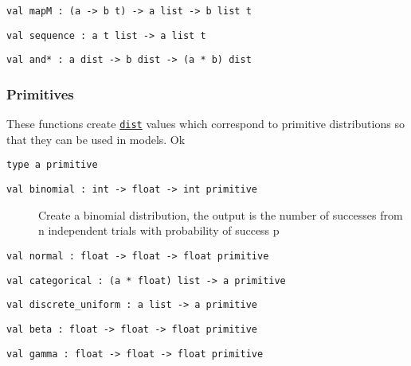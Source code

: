 \protect\hyperlink{val-mapM}{}\texttt{val\ mapM\ :\ (\textquotesingle{}a\ -\textgreater{}\ \textquotesingle{}b\ t)\ -\textgreater{}\ \textquotesingle{}a\ list\ -\textgreater{}\ \textquotesingle{}b\ list\ t}

\protect\hyperlink{val-sequence}{}\texttt{val\ sequence\ :\ \textquotesingle{}a\ t\ list\ -\textgreater{}\ \textquotesingle{}a\ list\ t}

\protect\hyperlink{val-andux2a}{}\texttt{val\ and*\ :\ \textquotesingle{}a\ dist\ -\textgreater{}\ \textquotesingle{}b\ dist\ -\textgreater{}\ (\textquotesingle{}a\ *\ \textquotesingle{}b)\ dist}

\hypertarget{distux5fprims}{\subsubsection{\texorpdfstring{\protect\hyperlink{distux5fprims}{}Primitives}{Primitives}}\label{distux5fprims}}

These functions create \href{index.html\#type-dist}{\texttt{dist}}
values which correspond to primitive distributions so that they can be
used in models. Ok

\protect\hyperlink{type-primitive}{}\texttt{type\ \textquotesingle{}a\ primitive}

\begin{description}
\item[{\protect\hyperlink{val-binomial}{}\texttt{val\ binomial\ :\ int\ -\textgreater{}\ float\ -\textgreater{}\ int\ primitive}}]
Create a binomial distribution, the output is the number of successes
from n independent trials with probability of success p
\end{description}

\protect\hyperlink{val-normal}{}\texttt{val\ normal\ :\ float\ -\textgreater{}\ float\ -\textgreater{}\ float\ primitive}

\protect\hyperlink{val-categorical}{}\texttt{val\ categorical\ :\ (\textquotesingle{}a\ *\ float)\ list\ -\textgreater{}\ \textquotesingle{}a\ primitive}

\protect\hyperlink{val-discreteux5funiform}{}\texttt{val\ discrete\_uniform\ :\ \textquotesingle{}a\ list\ -\textgreater{}\ \textquotesingle{}a\ primitive}

\protect\hyperlink{val-beta}{}\texttt{val\ beta\ :\ float\ -\textgreater{}\ float\ -\textgreater{}\ float\ primitive}

\protect\hyperlink{val-gamma}{}\texttt{val\ gamma\ :\ float\ -\textgreater{}\ float\ -\textgreater{}\ float\ primitive}

